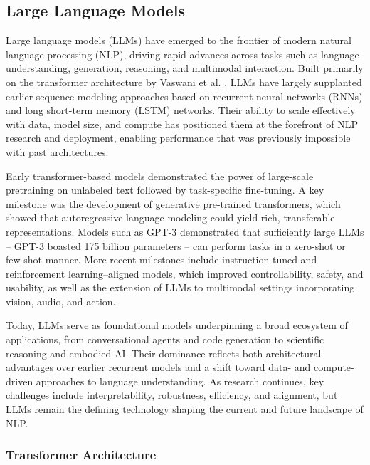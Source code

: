\documentclass[11pt]{article}
\begin{document}

\subsection{Large Language Models}
Large language models (LLMs) have emerged to the frontier of modern natural language processing (NLP), driving rapid advances across tasks such as language understanding, generation, reasoning, and multimodal interaction. Built primarily on the transformer architecture by Vaswani et al. \cite{DBLP:journals/corr/VaswaniSPUJGKP17}, LLMs have largely supplanted earlier sequence modeling approaches based on recurrent neural networks (RNNs) and long short-term memory (LSTM) networks. Their ability to scale effectively with data, model size, and compute has positioned them at the forefront of NLP research and deployment, enabling performance that was previously impossible with past architectures.

Early transformer-based models demonstrated the power of large-scale pretraining on unlabeled text followed by task-specific fine-tuning. A key milestone was the development of generative pre-trained transformers, which showed that autoregressive language modeling could yield rich, transferable representations. Models such as GPT-3 demonstrated that sufficiently large LLMs -- GPT-3 boasted 175 billion parameters -- can perform tasks in a zero-shot or few-shot manner. More recent milestones include instruction-tuned and reinforcement learning–aligned models, which improved controllability, safety, and usability, as well as the extension of LLMs to multimodal settings incorporating vision, audio, and action.

Today, LLMs serve as foundational models underpinning a broad ecosystem of applications, from conversational agents and code generation to scientific reasoning and embodied AI. Their dominance reflects both architectural advantages over earlier recurrent models and a shift toward data- and compute-driven approaches to language understanding. As research continues, key challenges include interpretability, robustness, efficiency, and alignment, but LLMs remain the defining technology shaping the current and future landscape of NLP.

\subsubsection{Transformer Architecture}
\end{document}
